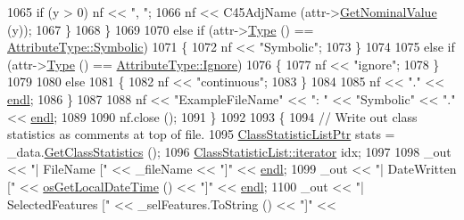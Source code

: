 \begin{DoxyCode}
1065           \textcolor{keywordflow}{if}  (y > 0)  nf << \textcolor{stringliteral}{", "};
1066           nf << C45AdjName (attr->\hyperlink{class_k_k_m_l_l_1_1_attribute_ad9342fb254fb972f63825f8d5be25311}{GetNominalValue} (y));
1067         \}
1068       \}
1069 
1070       \textcolor{keywordflow}{else} \textcolor{keywordflow}{if}  (attr->\hyperlink{class_k_k_m_l_l_1_1_attribute_ae867c1b4e264fb7be26941730364116d}{Type} () == \hyperlink{namespace_k_k_m_l_l_a99973706982b59debba670e2480555abaaddee1396a3e20ceea8071ed6da54866}{AttributeType::Symbolic})
1071       \{
1072         nf << \textcolor{stringliteral}{"Symbolic"};
1073       \}
1074 
1075       \textcolor{keywordflow}{else} \textcolor{keywordflow}{if}  (attr->\hyperlink{class_k_k_m_l_l_1_1_attribute_ae867c1b4e264fb7be26941730364116d}{Type} () == \hyperlink{namespace_k_k_m_l_l_a99973706982b59debba670e2480555abafd038fc7f319e48f3115d92bf5bdbef9}{AttributeType::Ignore})
1076       \{
1077         nf << \textcolor{stringliteral}{"ignore"};
1078       \}
1079 
1080       \textcolor{keywordflow}{else}
1081       \{
1082         nf << \textcolor{stringliteral}{"continuous"};
1083       \}
1084 
1085       nf << \textcolor{stringliteral}{"."} << \hyperlink{namespace_k_k_b_ad1f50f65af6adc8fa9e6f62d007818a8}{endl};
1086     \}
1087 
1088     nf << \textcolor{stringliteral}{"ExampleFileName"} << \textcolor{stringliteral}{": "} << \textcolor{stringliteral}{"Symbolic"} << \textcolor{stringliteral}{"."} << \hyperlink{namespace_k_k_b_ad1f50f65af6adc8fa9e6f62d007818a8}{endl};
1089 
1090     nf.close ();
1091   \}
1092 
1093   \{
1094     \textcolor{comment}{// Write out class statistics as comments at top of file.}
1095     \hyperlink{class_k_k_m_l_l_1_1_class_statistic_list}{ClassStatisticListPtr}  stats = \_data.\hyperlink{class_k_k_m_l_l_1_1_feature_vector_list_a25d68202689dd6400dcf9a3b18fd5ad9}{GetClassStatistics} ();
1096     \hyperlink{class_k_k_b_1_1_k_k_queue_aa3c2796a726eea468b94132a9fbf2cfe}{ClassStatisticList::iterator}  idx;
1097 
1098     \_out << \textcolor{stringliteral}{"|  FileName         ["} << \_fileName                     << \textcolor{stringliteral}{"]"} << 
      \hyperlink{namespace_k_k_b_ad1f50f65af6adc8fa9e6f62d007818a8}{endl};
1099     \_out << \textcolor{stringliteral}{"|  DateWritten      ["} << \hyperlink{namespace_k_k_b_af54c205cde0465bcb2c74f3881a96413}{osGetLocalDateTime} ()         << \textcolor{stringliteral}{"]"} << 
      \hyperlink{namespace_k_k_b_ad1f50f65af6adc8fa9e6f62d007818a8}{endl};
1100     \_out << \textcolor{stringliteral}{"|  SelectedFeatures ["} << \_selFeatures.ToString ()      << \textcolor{stringliteral}{"]"} << 

\end{DoxyCode}
